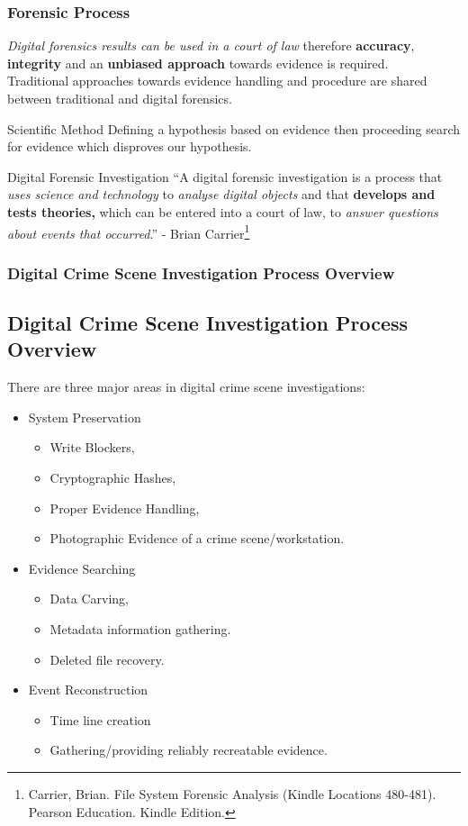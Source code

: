\documentclass{beamer}
\begin{document}
\begin{frame}
	\frametitle{Forensic Process}
	\textit{Digital forensics results can be used in a court of law} therefore \textbf{accuracy}, \textbf{integrity} and an \textbf{unbiased approach} towards evidence is required.\\
	Traditional approaches towards evidence handling and procedure are shared between traditional and digital forensics.   
	\begin{block}{Scientific Method}
		Defining a hypothesis based on evidence then proceeding search for evidence which disproves our hypothesis.
	\end{block}
	\begin{block}{Digital Forensic Investigation}
	``A digital forensic investigation is a process that \textit{uses science
     and technology} to \textit{analyse digital objects} and that \textbf{develops and
     tests theories,} which can be entered into a court of law, to
     \textit{answer questions about events that occurred}.'' - Brian Carrier\footnote{\tiny{Carrier, Brian. File System Forensic Analysis (Kindle Locations 480-481). Pearson Education. Kindle Edition.}} 
	\end{block}
\end{frame}

\begin{frame}
	\frametitle{Digital Crime Scene Investigation Process Overview}
	\subsection*{Digital Crime Scene Investigation Process Overview}
	There are three major areas in digital crime scene investigations:
	\begin{itemize}
		\item System Preservation
			\begin{itemize}
				\item Write Blockers,
				\item Cryptographic Hashes,
				\item Proper Evidence Handling,
				\item Photographic Evidence of a crime scene/workstation.
			\end{itemize}
		\item Evidence Searching
			\begin{itemize}
				\item Data Carving,
				\item Metadata information gathering.
				\item Deleted file recovery. 
			\end{itemize}
		\item Event Reconstruction
			\begin{itemize}
				\item Time line creation
				\item Gathering/providing reliably recreatable evidence. 
			\end{itemize}
	\end{itemize}
\end{frame}
\end{document}
